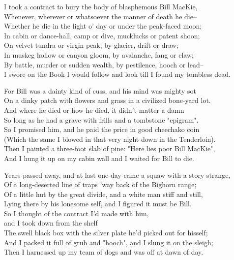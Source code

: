 
\begin{poemblock}
I took a contract to bury the body of blasphemous Bill MacKie,\\
Whenever, wherever or whatsoever the manner of death he die--\\
Whether he die in the light o' day or under the peak-faced moon;\\
In cabin or dance-hall, camp or dive, mucklucks or patent shoon;\\
On velvet tundra or virgin peak, by glacier, drift or draw;\\
In muskeg hollow or canyon gloom, by avalanche, fang or claw;\\
By battle, murder or sudden wealth, by pestilence, hooch or lead--\\
I swore on the Book I would follow and look till I found my tombless dead.

For Bill was a dainty kind of cuss, and his mind was mighty sot\\
On a dinky patch with flowers and grass in a civilized bone-yard lot.\\
And where he died or how he died, it didn't matter a damn\\
So long as he had a grave with frills and a tombstone "epigram".\\
So I promised him, and he paid the price in good cheechako coin\\
(Which the same I blowed in that very night down in the Tenderloin).\\
Then I painted a three-foot slab of pine:  "Here lies poor Bill MacKie",\\
And I hung it up on my cabin wall and I waited for Bill to die.

Years passed away, and at last one day came a squaw with a story strange,\\
Of a long-deserted line of traps 'way back of the Bighorn range;\\
Of a little hut by the great divide, and a white man stiff and still,\\
Lying there by his lonesome self, and I figured it must be Bill.\\
So I thought of the contract I'd made with him,\\
\idt and I took down from the shelf\\
The swell black box with the silver plate he'd picked out for hisself;\\
And I packed it full of grub and "hooch", and I slung it on the sleigh;\\
Then I harnessed up my team of dogs and was off at dawn of day.


\end{poemblock}
